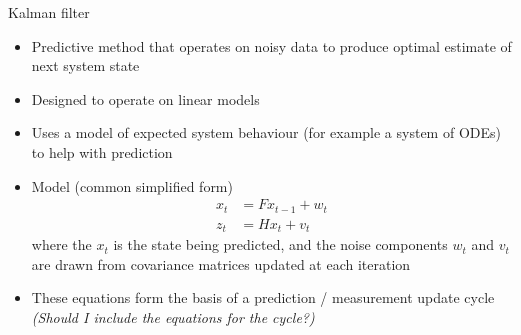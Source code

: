 \documentclass[10pt]{beamer}
\begin{document}
		\begin{frame}{Kalman filter}
			\begin{itemize}
				\item Predictive method that operates on noisy data to produce optimal estimate of next system state
				\item Designed to operate on linear models
				\item Uses a model of expected system behaviour (for example a system of ODEs) to help with prediction
				\item Model (common simplified form)
					\begin{equation*}
						\begin{array}{rl}
							x_t & = F x_{t-1} + w_t \\
							z_t & = H x_t + v_t
						\end{array}
					\end{equation*}
					where the $x_t$ is the state being predicted, and the noise components $w_t$ and $v_t$ are drawn from covariance matrices updated at each iteration
				\item These equations form the basis of a prediction / measurement update cycle\\
					{\it (Should I include the equations for the cycle?)}
			\end{itemize}
		\end{frame}
\end{document}
